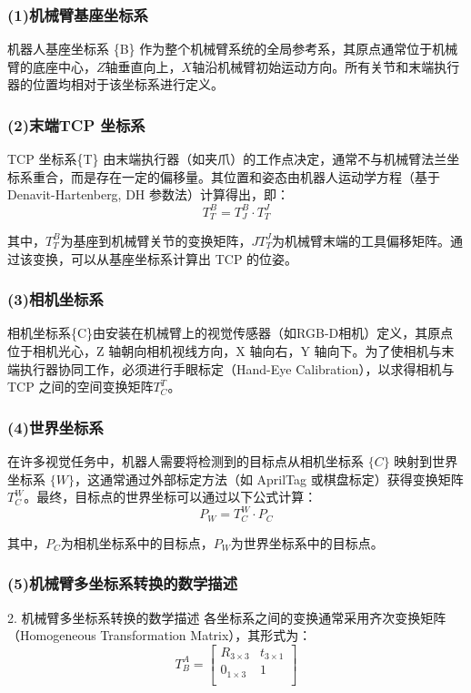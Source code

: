 \subsubsection*{(1)机械臂基座坐标系 }
机器人基座坐标系 \{B\} 作为整个机械臂系统的全局参考系，其原点通常位于机械臂的底座中心，$Z$轴垂直向上，$X$轴沿机械臂初始运动方向。所有关节和末端执行器的位置均相对于该坐标系进行定义。
\subsubsection*{(2)末端TCP 坐标系  }
TCP 坐标系\{T\} 由末端执行器（如夹爪）的工作点决定，通常不与机械臂法兰坐标系重合，而是存在一定的偏移量。其位置和姿态由机器人运动学方程（基于 Denavit-Hartenberg, DH 参数法）计算得出，即：
\begin{equation}
	\label{equ:coordinate_b_t}
	T^{B}_{T}=T^{B}_{J} \cdot T^{J}_{T} 
\end{equation}

其中，$T^{B}_{T} $为基座到机械臂关节的变换矩阵，$JT^{J}_{T}$为机械臂末端的工具偏移矩阵。通过该变换，可以从基座坐标系计算出 TCP 的位姿。
\subsubsection*{(3)相机坐标系 }
相机坐标系\{C\}由安装在机械臂上的视觉传感器（如RGB-D相机）定义，其原点位于相机光心，Z 轴朝向相机视线方向，X 轴向右，Y 轴向下。为了使相机与末端执行器协同工作，必须进行手眼标定（Hand-Eye Calibration），以求得相机与 TCP 之间的空间变换矩阵$T^{T}_{C}$。

\subsubsection*{(4)世界坐标系 }
在许多视觉任务中，机器人需要将检测到的目标点从相机坐标系 $\{C\}$ 映射到世界坐标系 $\{W\}$，这通常通过外部标定方法（如 AprilTag 或棋盘标定）获得变换矩阵 $T^{W}_{C}$。最终，目标点的世界坐标可以通过以下公式计算：
\begin{equation}
	\label{equ:coordinate_w_c}
	P_{W}=T^{W}_{C} \cdot P_{C} 
\end{equation}

其中，$P_{C} $为相机坐标系中的目标点，$P_{W}$为世界坐标系中的目标点。

\subsubsection*{(5)机械臂多坐标系转换的数学描述 }
2. 机械臂多坐标系转换的数学描述
各坐标系之间的变换通常采用齐次变换矩阵（Homogeneous Transformation Matrix），其形式为：
\begin{equation}
	\label{equ:coordinate_base}
	T^{A}_{B} =
	\begin{bmatrix}
		R_{3 \times 3} & t_{3\times 1}  \\
		0_{1 \times 3} & 1\\
	\end{bmatrix}
\end{equation}


